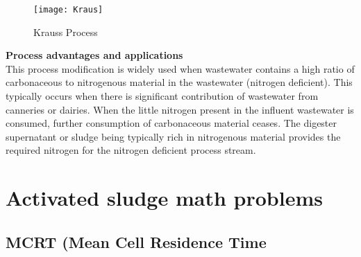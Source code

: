 \begin{figure}[h!]
\begin{center}
\texttt{[image: Kraus]}
\caption{Krauss Process}
\end{center}
\end{figure}

\noindent \textbf{Process advantages and applications}\\
This process modification is widely used when wastewater contains a high ratio of carbonaceous to nitrogenous material in the wastewater (nitrogen deficient).  This typically occurs when there is significant contribution of wastewater from canneries or dairies.  When the little nitrogen present in the influent wastewater is consumed, further consumption of carbonaceous material ceases.  The digester supernatant or sludge being typically rich in nitrogenous material provides the required nitrogen for the nitrogen deficient process stream.


\section{Activated sludge math problems}
\subsection{MCRT (Mean Cell Residence Time}


